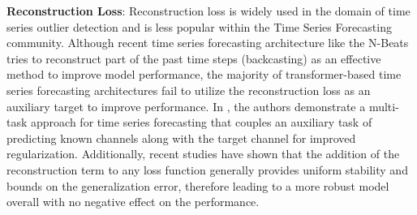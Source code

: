 \textbf{Reconstruction Loss}: Reconstruction loss is widely used in the domain of time series outlier detection \cite{tungbcc19} and is less popular within the Time Series Forecasting community. Although recent time series forecasting architecture like the N-Beats \cite{nbeats} tries to reconstruct part of the past time steps (backcasting) as an effective method to improve model performance, the majority of transformer-based time series forecasting architectures \cite{10.1145/3292500.3330662,lai2018modeling,tft} fail to utilize the reconstruction loss as an auxiliary target to improve performance. In \cite{jawed2019multi}, the authors demonstrate a multi-task approach for time series forecasting that couples an auxiliary task of predicting known channels along with the target channel for improved regularization. Additionally, recent studies \cite{le2018supervised} have shown that the addition of the reconstruction term to any loss function generally provides uniform stability and bounds on the generalization error, therefore leading to a more robust model overall with no negative effect on the performance. 


